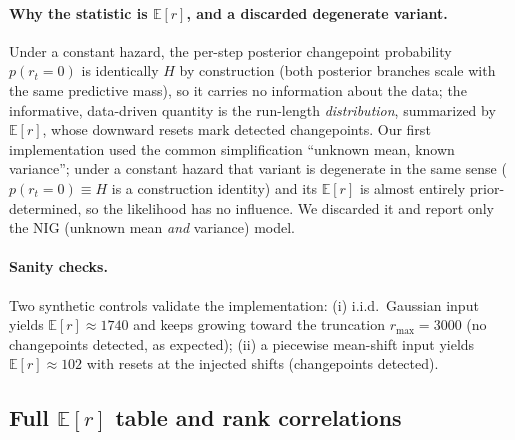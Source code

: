 \paragraph{Why the statistic is $\mathbb{E}[r]$, and a discarded degenerate variant.} Under a constant hazard, the per-step posterior changepoint probability $p(r_t{=}0)$ is identically $H$ by construction (both posterior branches scale with the same predictive mass), so it carries no information about the data; the informative, data-driven quantity is the run-length \emph{distribution}, summarized by $\mathbb{E}[r]$, whose downward resets mark detected changepoints. Our first implementation used the common simplification ``unknown mean, known variance''; under a constant hazard that variant is degenerate in the same sense ($p(r_t{=}0) \equiv H$ is a construction identity) and its $\mathbb{E}[r]$ is almost entirely prior-determined, so the likelihood has no influence. We discarded it and report only the NIG (unknown mean \emph{and} variance) model.

\paragraph{Sanity checks.} Two synthetic controls validate the implementation: (i) i.i.d.\ Gaussian input yields $\mathbb{E}[r] \approx 1740$ and keeps growing toward the truncation $r_{\max}=3000$ (no changepoints detected, as expected); (ii) a piecewise mean-shift input yields $\mathbb{E}[r] \approx 102$ with resets at the injected shifts (changepoints detected).

\subsection{Full $\mathbb{E}[r]$ table and rank correlations}

